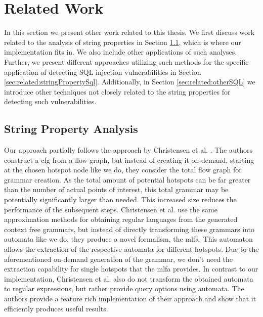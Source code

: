 \chapter{Related Work}
\label{chapter:RelatedWork}

In this section we present other work related to this thesis. We first discuss work related to the analysis of string properties in Section \ref{sec:related:stringproperty}, which is where our implementation fits in. We also include other applications of such analyses. Further, we present different approaches utilizing such methods for the specific application of detecting SQL injection vulnerabilities in Section \ref{sec:related:stringPropertySql}. Additionally, in Section \ref{sec:related:otherSQL} we introduce other techniques not closely related to the string properties for detecting such vulnerabilities.


\section{String Property Analysis}\label{sec:related:stringproperty}

Our approach partially follows the approach by Christensen et al. \cite{brics}. The authors construct a \acl{cfg} from a flow graph, but instead of creating it on-demand, starting at the chosen hotspot node like we do, they consider the total flow graph for grammar creation.
As the total amount of potential hotspots can be far greater than the number of actual points of interest, this total grammar may be potentially significantly larger than needed. This increased size reduces the performance of the subsequent steps.
Christensen et al. use the same approximation methods for obtaining regular languages from the generated context free grammars, but instead of directly transforming these grammars into automata like we do, they produce a novel formalism, the \ac{mlfa}.
This automaton allows the extraction of the respective automata for different hotspots. Due to the aforementioned on-demand generation of the grammar, we don't need the extraction capability for single hotspots that the \ac{mlfa} provides. In contrast to our implementation, Christensen et al. also do not transform the obtained automata to regular expressions, but rather provide query options using automata.
The authors provide a feature rich implementation of their approach and show that it efficiently produces useful results.

